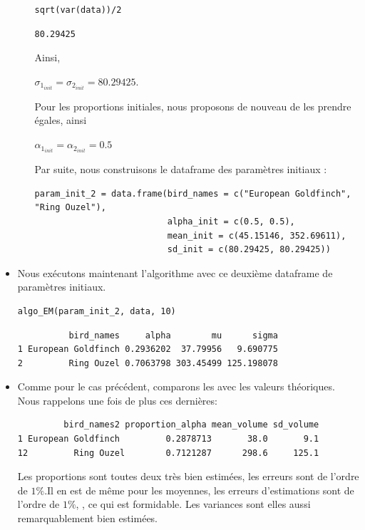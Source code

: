 \documentclass[frenchb]{report}
\newcommand{\1}{\mathbbm{1}}
\theoremstyle{definition}\newtheorem{defn}{Définition}
\theoremstyle{definition}\newtheorem{exm}{Exemple}
\theoremstyle{definition}\newtheorem{nota}{Notation}
\theoremstyle{definition}\newtheorem{rem}{Remarque}
\begin{document}
\begin{itemize}[label=\adfflowerleft]
\begin{itemize}[label=\adfflowerleft]
\begin{lstlisting}
sqrt(var(data))/2
\end{lstlisting}

\begin{verbatim}
80.29425
\end{verbatim}
Ainsi, 
\begin{center}
$\sigma_{1_{init}} = \sigma_{2_{init}} = 80.29425$. \newline
\end{center}
Pour les proportions initiales, nous proposons de nouveau de les prendre égales, ainsi 
\begin{center}
$\alpha_{1_{init}} = \alpha_{2_{init}} = 0.5$
\end{center}
Par suite, nous construisons le dataframe des paramètres initiaux : 
\begin{lstlisting}
param_init_2 = data.frame(bird_names = c("European Goldfinch", "Ring Ouzel"),
                          alpha_init = c(0.5, 0.5),
                          mean_init = c(45.15146, 352.69611),
                          sd_init = c(80.29425, 80.29425))
\end{lstlisting}
\end{itemize}
\newpage
\item Nous exécutons maintenant l'algorithme avec ce deuxième dataframe de paramètres initiaux.
\begin{lstlisting}
algo_EM(param_init_2, data, 10)
\end{lstlisting}

\begin{verbatim}
          bird_names     alpha        mu      sigma
1 European Goldfinch 0.2936202  37.79956   9.690775
2         Ring Ouzel 0.7063798 303.45499 125.198078
\end{verbatim}

\item Comme pour le cas précédent, comparons les avec les valeurs théoriques. Nous rappelons une fois de plus ces dernières:
\begin{verbatim}
         bird_names2 proportion_alpha mean_volume sd_volume
1 European Goldfinch         0.2878713       38.0       9.1
12         Ring Ouzel        0.7121287      298.6     125.1
\end{verbatim}

Les proportions sont toutes deux très bien estimées, les erreurs sont de l'ordre de $1\%$.Il en est de même pour les moyennes, les erreurs d'estimations sont de l'ordre de $1\%$, , ce qui est formidable. Les variances sont elles aussi remarquablement bien estimées.

\end{itemize}
\end{document}
